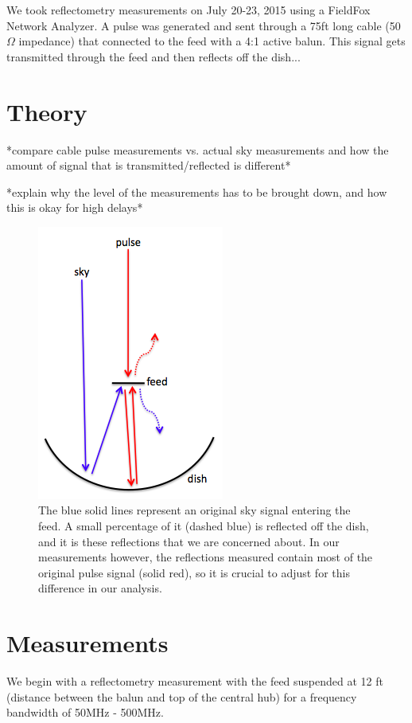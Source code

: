 \documentclass[12pt,preprint]{aastex}
\begin{document}
We took reflectometry measurements on July 20-23, 2015 using a FieldFox Network Analyzer. A pulse was generated and sent through a 75ft long cable (50$\Omega$ impedance) that connected to the feed with a 4:1 active balun. This signal gets transmitted through the feed and then reflects off the dish...

\section{Theory}

*compare cable pulse measurements vs. actual sky measurements and how the amount of signal that is transmitted/reflected is different*

*explain why the level of the measurements has to be brought down, and how this is okay for high delays*

\begin{figure}
\centering
\includegraphics[totalheight=0.5\textheight]{plots/reflection_cartoon.png}
\caption{The blue solid lines represent an original sky signal entering the feed. A small percentage of it (dashed blue) is reflected off the dish, and it is these reflections that we are concerned about. In our measurements however, the reflections measured contain most of the original pulse signal (solid red), so it is crucial to adjust for this difference in our analysis.}
\end{figure}


\section{Measurements}

We begin with a reflectometry measurement with the feed suspended at 12 ft (distance between the balun and top of the central hub) for a frequency bandwidth of 50MHz - 500MHz.
\end{document}

